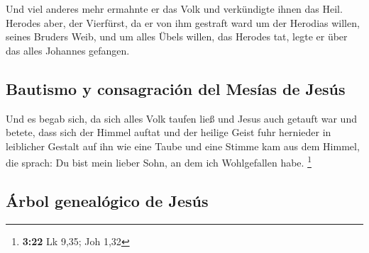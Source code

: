  Und viel anderes mehr ermahnte er das Volk und
verkündigte ihnen das Heil.  Herodes aber, der Vierfürst,
da er von ihm gestraft ward um der Herodias willen, seines Bruders Weib,
und um alles Übels willen, das Herodes tat,  legte er
über das alles Johannes gefangen.

\hypertarget{bautismo-y-consagraciuxf3n-del-mesuxedas-de-jesuxfas}{%
\subsection{Bautismo y consagración del Mesías de
Jesús}\label{bautismo-y-consagraciuxf3n-del-mesuxedas-de-jesuxfas}}

 Und es begab sich, da sich alles Volk taufen ließ und
Jesus auch getauft war und betete, dass sich der Himmel auftat
 und der heilige Geist fuhr hernieder in leiblicher
Gestalt auf ihn wie eine Taube und eine Stimme kam aus dem Himmel, die
sprach: Du bist mein lieber Sohn, an dem ich Wohlgefallen habe.
\footnote{\textbf{3:22} Lk 9,35; Joh 1,32}

\hypertarget{uxe1rbol-genealuxf3gico-de-jesuxfas}{%
\subsection{Árbol genealógico de
Jesús}\label{uxe1rbol-genealuxf3gico-de-jesuxfas}}

